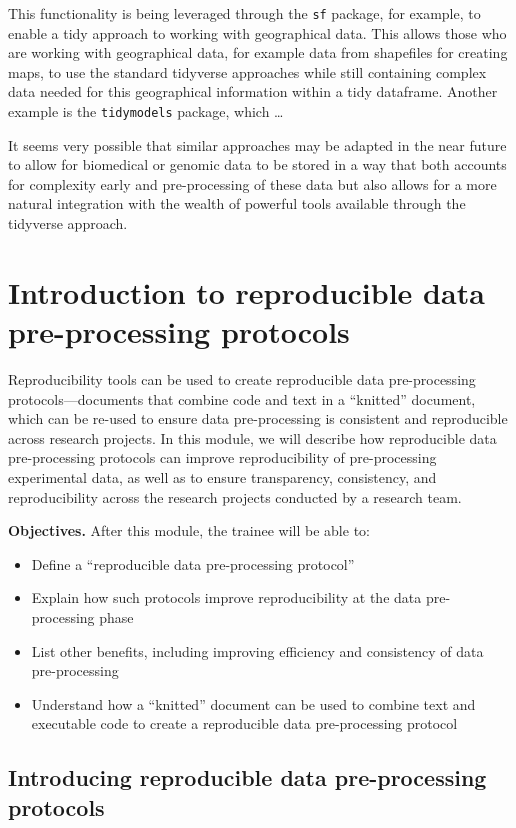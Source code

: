 \documentclass[]{tufte-book}
\providecommand{\tightlist}{%
  \setlength{\itemsep}{0pt}\setlength{\parskip}{0pt}}
\begin{document}
This functionality is being leveraged through the \texttt{sf}
package, for example, to enable a tidy approach to working with geographical
data. This allows those who are working with geographical data, for example data
from shapefiles for creating maps, to use the standard tidyverse approaches
while still containing complex data needed for this geographical information
within a tidy dataframe. Another example is the \texttt{tidymodels} package, which \ldots{}

It seems very possible that similar approaches may be adapted in the near future
to allow for biomedical or genomic data to be stored in a way that both accounts
for complexity early and pre-processing of these data but also allows for a more
natural integration with the wealth of powerful tools available through the
tidyverse approach.

\section{Introduction to reproducible data pre-processing protocols}\label{module18}

Reproducibility tools can be used to create reproducible data pre-processing
protocols---documents that combine code and text in a ``knitted'' document, which
can be re-used to ensure data pre-processing is consistent and reproducible
across research projects. In this module, we will describe how reproducible data
pre-processing protocols can improve reproducibility of pre-processing
experimental data, as well as to ensure transparency, consistency, and
reproducibility across the research projects conducted by a research team.

\textbf{Objectives.} After this module, the trainee will be able to:

\begin{itemize}
\tightlist
\item
  Define a ``reproducible data pre-processing protocol''
\item
  Explain how such protocols improve reproducibility at the data pre-processing
  phase
\item
  List other benefits, including improving efficiency and consistency of data
  pre-processing
\item
  Understand how a ``knitted'' document can be used to combine text and
  executable code to create a reproducible data pre-processing protocol
\end{itemize}

\subsection{Introducing reproducible data pre-processing protocols}\label{introducing-reproducible-data-pre-processing-protocols}
\end{document}
